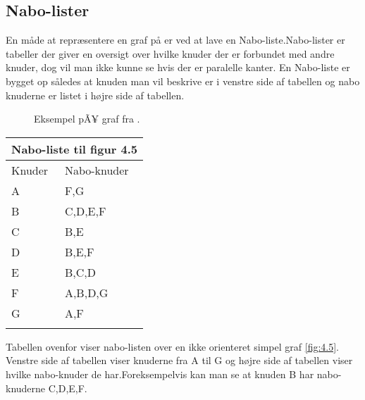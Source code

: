 \subsection{Nabo-lister}
En måde at repræsentere en graf på er ved at lave en Nabo-liste.Nabo-lister er tabeller der giver en oversigt over hvilke knuder der er forbundet med andre knuder, dog vil man ikke kunne se hvis der er paralelle kanter. En Nabo-liste er bygget op således at knuden man vil beskrive er i venstre side af tabellen og nabo knuderne er listet i højre side af tabellen. \\

\begin{figure}[h]
  \centering
  \caption{Eksempel pÃ¥ graf fra \citep{dmat}.}
  \label{fig:graf}
\end{figure}

\begin{center}
	\begin{tabular}{ |p{4cm}||p{3cm}|}
	 	\hline
 		\multicolumn{2}{|c|}{Nabo-liste til figur 4.5} \\
 		\hline
 		Knuder & Nabo-knuder\\
 		\hline
 		A & F,G \\
		B & C,D,E,F \\
		C & B,E \\
		D & B,E,F \\
		E & B,C,D \\
		F & A,B,D,G \\
		G & A,F \\
 	\hline
 	\label{tab:Nabo-liste}
	\end{tabular}
\end{center}
Tabellen ovenfor viser nabo-listen over en ikke orienteret simpel graf \ref{fig:4.5}. Venstre side af tabellen viser knuderne fra A til G og højre side af tabellen viser hvilke nabo-knuder de har.Foreksempelvis kan man se at knuden B har nabo-knuderne C,D,E,F. 
